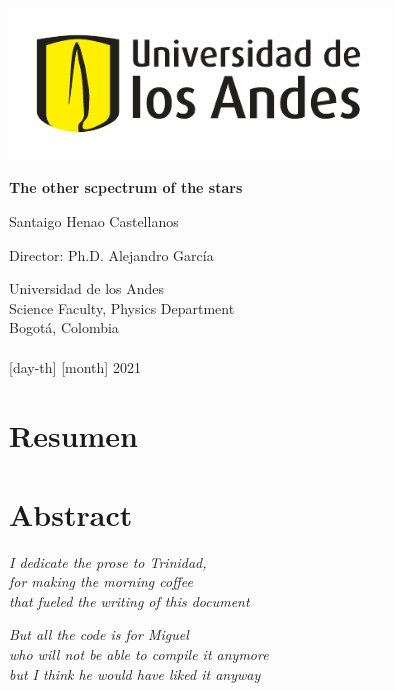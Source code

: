 \documentclass[12pt,letterpaper,oneside]{book}
\begin{document}
	\begin{titlepage}
	\begin{center}
		\includegraphics[width=10cm]{img/logo-uniandes.pdf}
		
		\vspace{2cm}
		
		{\fontsize{30}{45}\selectfont \bf The other scpectrum of the stars\par}
		
		\vspace{10mm}
		
		
		{\huge Santaigo Henao Castellanos}
		
		\vspace{10mm}
		
		{\huge Director: Ph.D. Alejandro García } 
		
		\vspace{15mm}
		
		{\Large
		Universidad de los Andes\\
		Science Faculty, Physics Department\\
		Bogotá, Colombia\\ \phantom{} \\
		{[day-th]} {[month]} 2021}
	\end{center}
	\end{titlepage}

\frontmatter

\chapter*{Resumen}

\chapter*{Abstract}

\newpage

\begin{flushright}
	\textit{
		I dedicate the prose to Trinidad,        \\
		for making the morning coffee            \\ 
		that fueled the writing of this document
	}
	
	\vspace{5mm}
	
	\textit{
		But all the code is for Miguel             \\
		who will not be able to compile it anymore \\ 
		but I think he would have liked it anyway
	}

\end{flushright}
\end{document}
